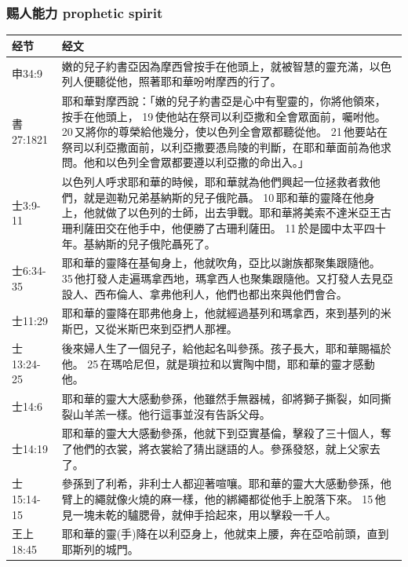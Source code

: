 \subsubsection{赐人能力 prophetic spirit}
\begin{table}[H]
\centering
\begin{tabular}{p{6em}p{40em}}  \toprule
经节&经文 \\  \midrule
申34:9&嫩的兒子約書亞因為摩西曾按手在他頭上，就被智慧的靈充滿，以色列人便聽從他，照著耶和華吩咐摩西的行了。\\  \midrule
書27:1821&耶和華對摩西說：「嫩的兒子約書亞是心中有聖靈的，你將他領來，按手在他頭上， 19 使他站在祭司以利亞撒和全會眾面前，囑咐他。 20 又將你的尊榮給他幾分，使以色列全會眾都聽從他。 21 他要站在祭司以利亞撒面前，以利亞撒要憑烏陵的判斷，在耶和華面前為他求問。他和以色列全會眾都要遵以利亞撒的命出入。」\\  \midrule

士3:9-11&以色列人呼求耶和華的時候，耶和華就為他們興起一位拯救者救他們，就是迦勒兄弟基納斯的兒子俄陀聶。 10 耶和華的靈降在他身上，他就做了以色列的士師，出去爭戰。耶和華將美索不達米亞王古珊利薩田交在他手中，他便勝了古珊利薩田。 11 於是國中太平四十年。基納斯的兒子俄陀聶死了。\\  \midrule
士6:34-35&耶和華的靈降在基甸身上，他就吹角，亞比以謝族都聚集跟隨他。 35 他打發人走遍瑪拿西地，瑪拿西人也聚集跟隨他。又打發人去見亞設人、西布倫人、拿弗他利人，他們也都出來與他們會合。\\  \midrule
士11:29&耶和華的靈降在耶弗他身上，他就經過基列和瑪拿西，來到基列的米斯巴，又從米斯巴來到亞捫人那裡。 \\  \midrule
士13:24-25&後來婦人生了一個兒子，給他起名叫參孫。孩子長大，耶和華賜福於他。 25 在瑪哈尼但，就是瑣拉和以實陶中間，耶和華的靈才感動他。\\  \midrule

士14:6&耶和華的靈大大感動參孫，他雖然手無器械，卻將獅子撕裂，如同撕裂山羊羔一樣。他行這事並沒有告訴父母。\\  \midrule
士14:19&耶和華的靈大大感動參孫，他就下到亞實基倫，擊殺了三十個人，奪了他們的衣裳，將衣裳給了猜出謎語的人。參孫發怒，就上父家去了。\\  \midrule

士15:14-15&參孫到了利希，非利士人都迎著喧嚷。耶和華的靈大大感動參孫，他臂上的繩就像火燒的麻一樣，他的綁繩都從他手上脫落下來。 15 他見一塊未乾的驢腮骨，就伸手拾起來，用以擊殺一千人。\\  \midrule

王上18:45&耶和華的靈(手)降在以利亞身上，他就束上腰，奔在亞哈前頭，直到耶斯列的城門。\\  \midrule


\end{tabular}
\end{table}
